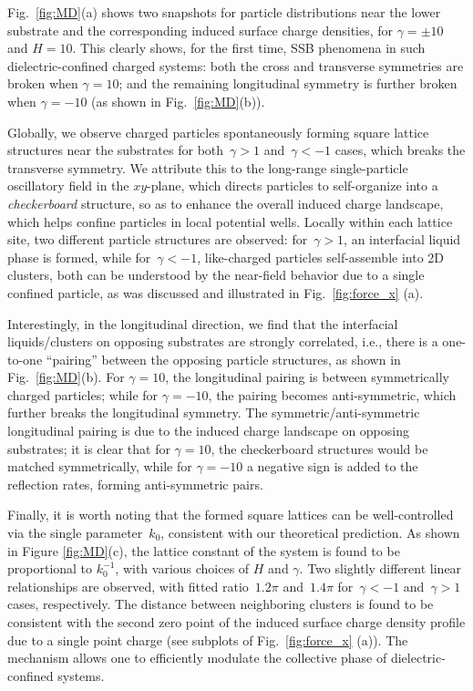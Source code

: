 Fig.~\ref{fig:MD}(a) shows two snapshots for particle distributions near the lower substrate and the corresponding induced surface charge densities, for $\gamma=\pm10$ and $H=10$. This clearly shows, for the first time, SSB phenomena in such dielectric-confined charged systems: both the cross and transverse symmetries are broken when $\gamma=10$; and the remaining longitudinal symmetry is further broken when $\gamma=-10$ (as shown in Fig.~\ref{fig:MD}(b)).

Globally, we observe charged particles spontaneously forming square lattice structures near the substrates for both~$\gamma > 1$ and~$\gamma < -1$ cases, which breaks the transverse symmetry. 
We attribute this to the long-range single-particle oscillatory field in the $xy$-plane, which directs particles to self-organize into a \emph{checkerboard} structure, so as to enhance the overall induced charge landscape, which helps confine particles in local potential wells.
Locally within each lattice site, two different particle structures are observed: for~$\gamma >1$, an interfacial liquid phase is formed, while for~$\gamma < -1$, like-charged particles self-assemble into 2D clusters, both can be understood by the near-field behavior due to a single confined particle, as was discussed and illustrated in Fig.~\ref{fig:force_x} (a).

Interestingly, in the longitudinal direction, we find that the interfacial liquids/clusters on opposing substrates are strongly correlated, i.e., there is a one-to-one ``pairing'' between the opposing particle structures, as shown in Fig.~\ref{fig:MD}(b).
For $\gamma=10$, the longitudinal pairing is between symmetrically charged particles; while for $\gamma=-10$, the pairing becomes anti-symmetric, which further breaks the longitudinal symmetry. The symmetric/anti-symmetric longitudinal pairing is due to the induced charge landscape on opposing substrates; it is clear that for $\gamma=10$, the checkerboard structures would be matched symmetrically, while for $\gamma=-10$ a negative sign is added to the reflection rates, forming anti-symmetric pairs.

Finally, it is worth noting that the formed square lattices can be well-controlled via the single parameter~$k_0$, consistent with our theoretical prediction.
As shown in Figure \ref{fig:MD}(c), the lattice constant of the system is found to be proportional to $k_0^{-1}$, with various choices of $H$ and $\gamma$. 
Two slightly different linear relationships are observed, with fitted ratio~$1.2 \pi$ and~$1.4 \pi$ for~$\gamma < -1$ and~$\gamma > 1$ cases, respectively. 
The distance between neighboring clusters is found to be consistent with the second zero point of the induced surface charge density profile due to a single point charge (see subplots of Fig.~\ref{fig:force_x} (a)). The mechanism allows one to efficiently modulate the collective phase of dielectric-confined systems.